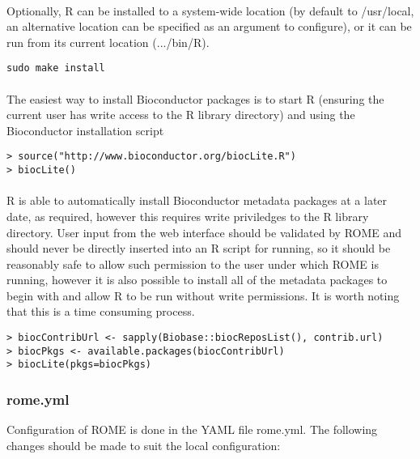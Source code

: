 \paragraph{}
Optionally, R can be installed to a system-wide location (by default to /usr/local, an alternative location can be specified as an argument to configure), or it can be run from its current location (.../bin/R).

\begin{verbatim}
sudo make install
\end{verbatim}


\paragraph{}
The easiest way to install Bioconductor packages is to start R (ensuring the current user has write access to the R library directory) and using the Bioconductor installation script
\begin{verbatim}
> source("http://www.bioconductor.org/biocLite.R")
> biocLite()
\end{verbatim}

\paragraph{}
R is able to automatically install Bioconductor metadata packages at a later date, as required, however this requires  write priviledges to the R library directory. User input from the web interface should be validated by ROME and should never be directly inserted into an R script for running, so it should be reasonably safe to allow such permission to the user under which ROME is running, however it is also possible to install all of the metadata packages to begin with and allow R to be run without write permissions. It is worth noting that this is a time consuming process.

\begin{verbatim}
> biocContribUrl <- sapply(Biobase::biocReposList(), contrib.url)
> biocPkgs <- available.packages(biocContribUrl)
> biocLite(pkgs=biocPkgs)
\end{verbatim}


\subsubsection{rome.yml}
Configuration of ROME is done in the YAML file rome.yml. The following changes should be made to suit the local configuration:

